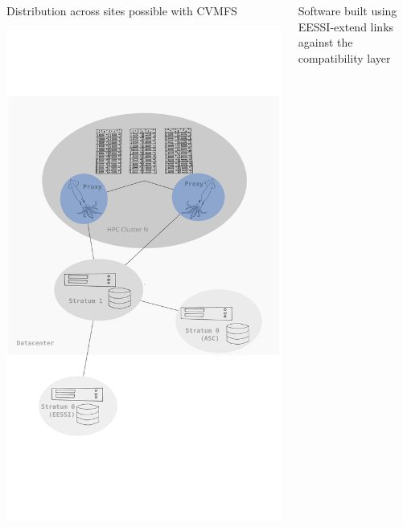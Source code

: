 \documentclass[final]{beamer}
\begin{document}
\begin{frame}[t]
\begin{columns}[t]
\begin{column}{0.48\textwidth}
    \begin{block}{Distribution across sites possible with CVMFS}
      \begin{center}
        \includegraphics[width=280mm]{./include/main_cvmfs.pdf}
      \end{center}
    \end{block}
  \end{column}

  \begin{column}{0.48\textwidth}
      \begin{block}{Software built using EESSI-extend links against the compatibility layer}
        
      \end{block}


\end{column}
\end{columns}
\end{frame}
\end{document}
